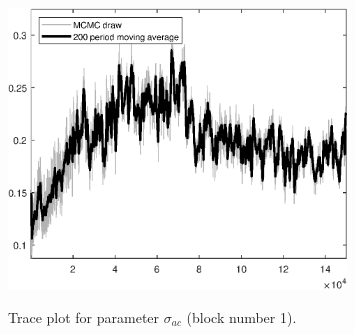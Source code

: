 \begin{figure}[H]
\centering
  \includegraphics[width=0.8\textwidth]{BRS_sectoral_wo_gmf/graphs/TracePlot_sigma_ac_blck_1}\\
    \caption{Trace plot for parameter ${\sigma_{ac}}$ (block number 1).}
\end{figure}
